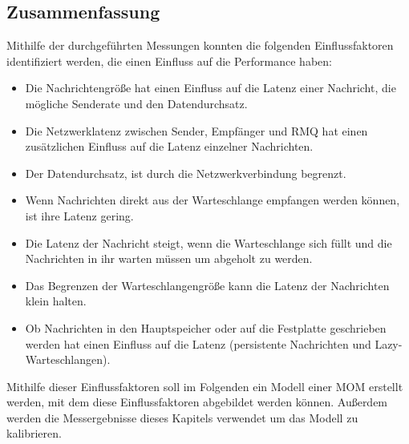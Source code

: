 \subsection{Zusammenfassung}
\label{sec:rmqZusammenfassung}
Mithilfe der durchgeführten Messungen konnten die folgenden Einflussfaktoren identifiziert werden, die einen Einfluss auf die Performance haben:
\begin{itemize}
    \item Die Nachrichtengröße hat einen Einfluss auf die Latenz einer Nachricht, die mögliche Senderate und den Datendurchsatz.
    \item Die Netzwerklatenz zwischen Sender, Empfänger und RMQ hat einen zusätzlichen Einfluss auf die Latenz einzelner Nachrichten.
    \item Der Datendurchsatz, ist durch die Netzwerkverbindung begrenzt.
    \item Wenn Nachrichten direkt aus der Warteschlange empfangen werden können, ist ihre Latenz gering.
    \item Die Latenz der Nachricht steigt, wenn die Warteschlange sich füllt und die Nachrichten in ihr warten müssen um abgeholt zu werden.
    \item Das Begrenzen der Warteschlangengröße kann die Latenz der Nachrichten klein halten.
    \item Ob Nachrichten in den Hauptspeicher oder auf die Festplatte geschrieben werden hat einen Einfluss auf die Latenz (persistente Nachrichten und Lazy-Warteschlangen).
\end{itemize}
Mithilfe dieser Einflussfaktoren soll im Folgenden ein Modell einer MOM erstellt werden, mit dem diese Einflussfaktoren abgebildet werden können. Außerdem werden die Messergebnisse dieses Kapitels verwendet um das Modell zu kalibrieren.







